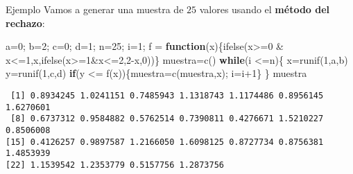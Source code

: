 \documentclass[
  ignorenonframetext,
  aspectratio=169]{beamer}
\newenvironment{Shaded}{\begin{snugshade}}{\end{snugshade}}
\newcommand{\ControlFlowTok}[1]{\textcolor[rgb]{0.13,0.29,0.53}{\textbf{#1}}}
\newcommand{\DecValTok}[1]{\textcolor[rgb]{0.00,0.00,0.81}{#1}}
\newcommand{\FunctionTok}[1]{\textcolor[rgb]{0.00,0.00,0.00}{#1}}
\newcommand{\NormalTok}[1]{#1}
\newcommand{\OtherTok}[1]{\textcolor[rgb]{0.56,0.35,0.01}{#1}}
\newcommand{\SpecialCharTok}[1]{\textcolor[rgb]{0.00,0.00,0.00}{#1}}
\begin{document}
\begin{frame}[fragile]{Ejemplo}
\protect\hypertarget{ejemplo-9}{}
Vamos a generar una muestra de \(25\) valores usando el \textbf{método
del rechazo}:

\begin{Shaded}
\begin{Highlighting}[]
\NormalTok{a}\OtherTok{=}\DecValTok{0}\NormalTok{; b}\OtherTok{=}\DecValTok{2}\NormalTok{; c}\OtherTok{=}\DecValTok{0}\NormalTok{; d}\OtherTok{=}\DecValTok{1}\NormalTok{; n}\OtherTok{=}\DecValTok{25}\NormalTok{; i}\OtherTok{=}\DecValTok{1}\NormalTok{;}
\NormalTok{f }\OtherTok{=} \ControlFlowTok{function}\NormalTok{(x)\{}\FunctionTok{ifelse}\NormalTok{(x}\SpecialCharTok{\textgreater{}=}\DecValTok{0} \SpecialCharTok{\&}\NormalTok{ x}\SpecialCharTok{\textless{}=}\DecValTok{1}\NormalTok{,x,}\FunctionTok{ifelse}\NormalTok{(x}\SpecialCharTok{\textgreater{}=}\DecValTok{1}\SpecialCharTok{\&}\NormalTok{x}\SpecialCharTok{\textless{}=}\DecValTok{2}\NormalTok{,}\DecValTok{2}\SpecialCharTok{{-}}\NormalTok{x,}\DecValTok{0}\NormalTok{))\}}
\NormalTok{muestra}\OtherTok{=}\FunctionTok{c}\NormalTok{()}
\ControlFlowTok{while}\NormalTok{(i }\SpecialCharTok{\textless{}=}\NormalTok{n)\{}
\NormalTok{  x}\OtherTok{=}\FunctionTok{runif}\NormalTok{(}\DecValTok{1}\NormalTok{,a,b)}
\NormalTok{  y}\OtherTok{=}\FunctionTok{runif}\NormalTok{(}\DecValTok{1}\NormalTok{,c,d)}
  \ControlFlowTok{if}\NormalTok{(y }\SpecialCharTok{\textless{}=} \FunctionTok{f}\NormalTok{(x))\{muestra}\OtherTok{=}\FunctionTok{c}\NormalTok{(muestra,x); i}\OtherTok{=}\NormalTok{i}\SpecialCharTok{+}\DecValTok{1}\NormalTok{\}}
\NormalTok{\}}
\NormalTok{muestra}
\end{Highlighting}
\end{Shaded}

\begin{verbatim}
 [1] 0.8934245 1.0241151 0.7485943 1.1318743 1.1174486 0.8956145 1.6270601
 [8] 0.6737312 0.9584882 0.5762514 0.7390811 0.4276671 1.5210227 0.8506008
[15] 0.4126257 0.9897587 1.2166050 1.6098125 0.8727734 0.8756381 1.4853939
[22] 1.1539542 1.2353779 0.5157756 1.2873756
\end{verbatim}
\end{frame}
\end{document}
